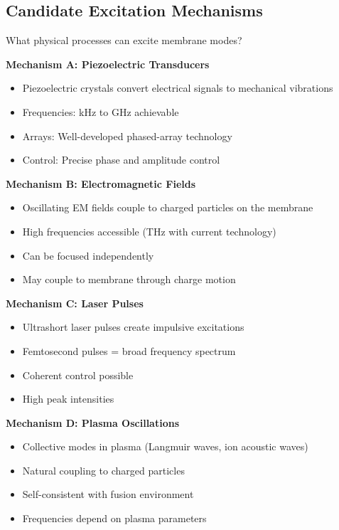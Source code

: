 \documentclass[12pt,a4paper]{article}
\begin{document}
\subsection{Candidate Excitation Mechanisms}

What physical processes can excite membrane modes?

\textbf{Mechanism A: Piezoelectric Transducers}
\begin{itemize}
    \item Piezoelectric crystals convert electrical signals to mechanical vibrations
    \item Frequencies: kHz to GHz achievable
    \item Arrays: Well-developed phased-array technology
    \item Control: Precise phase and amplitude control
\end{itemize}

\textbf{Mechanism B: Electromagnetic Fields}
\begin{itemize}
    \item Oscillating EM fields couple to charged particles on the membrane
    \item High frequencies accessible (THz with current technology)
    \item Can be focused independently
    \item May couple to membrane through charge motion
\end{itemize}

\textbf{Mechanism C: Laser Pulses}
\begin{itemize}
    \item Ultrashort laser pulses create impulsive excitations
    \item Femtosecond pulses = broad frequency spectrum
    \item Coherent control possible
    \item High peak intensities
\end{itemize}

\textbf{Mechanism D: Plasma Oscillations}
\begin{itemize}
    \item Collective modes in plasma (Langmuir waves, ion acoustic waves)
    \item Natural coupling to charged particles
    \item Self-consistent with fusion environment
    \item Frequencies depend on plasma parameters
\end{itemize}
\end{document}
